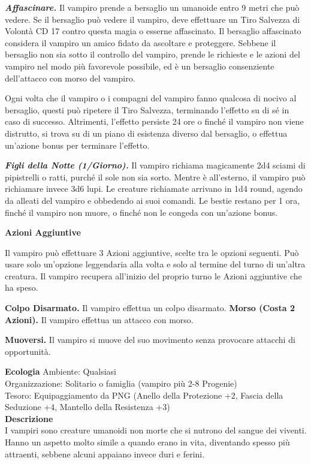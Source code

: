 \begin{multicols}{2}
\emph{\textbf{Affascinare.}} Il vampiro prende a bersaglio un umanoide entro 9 metri che può vedere. Se il bersaglio può vedere il vampiro, deve effettuare un Tiro Salvezza di Volontà CD 17 contro questa magia o esserne affascinato. Il bersaglio affascinato considera il vampiro un amico fidato da ascoltare e proteggere. Sebbene il bersaglio non sia sotto il controllo del vampiro, prende le richieste e le azioni del vampiro nel modo più favorevole possibile, ed è un bersaglio consenziente dell'attacco con morso del vampiro.

Ogni volta che il vampiro o i compagni del vampiro fanno qualcosa di nocivo al bersaglio, questi può ripetere il Tiro Salvezza, terminando l'effetto su di sé in caso di successo. Altrimenti, l'effetto persiste 24 ore o finché il vampiro non viene distrutto, si trova su di un piano di esistenza diverso dal bersaglio, o effettua un'azione bonus per terminare l'effetto.

\emph{\textbf{Figli della Notte (1/Giorno).}} Il vampiro richiama magicamente 2d4 sciami di pipistrelli o ratti, purché il sole non sia sorto. Mentre è all'esterno, il vampiro può richiamare invece 3d6 lupi. Le creature richiamate arrivano in 1d4 round, agendo da alleati del vampiro e obbedendo ai suoi comandi. Le bestie restano per 1 ora, finché il vampiro non muore, o finché non le congeda con un'azione bonus.

\textbf{Azioni Aggiuntive}

Il vampiro può effettuare 3 Azioni aggiuntive, scelte tra le opzioni seguenti. Può usare solo un'opzione leggendaria alla volta e solo al termine del turno di un'altra creatura. Il vampiro recupera all'inizio del proprio turno le Azioni aggiuntive che ha speso.

\textbf{Colpo Disarmato.} Il vampiro effettua un colpo disarmato. \textbf{Morso (Costa 2 Azioni).} Il vampiro effettua un attacco con
morso.

\textbf{Muoversi.} Il vampiro si muove del suo movimento senza provocare attacchi di opportunità.

\textbf{Ecologia}
Ambiente: Qualsiasi\\
Organizzazione: Solitario o famiglia (vampiro più 2-8 Progenie)\\
Tesoro: Equipaggiamento da PNG (Anello della Protezione +2, Fascia della Seduzione +4, Mantello della Resistenza +3)\\
\textbf{Descrizione}\\
I vampiri sono creature umanoidi non morte che si nutrono del sangue dei viventi. Hanno un aspetto molto simile a quando erano in vita, diventando spesso più attraenti, sebbene alcuni appaiano invece duri e ferini.\\




\end{multicols}
